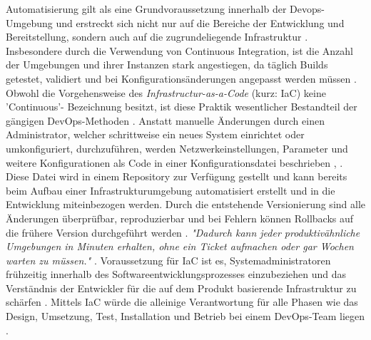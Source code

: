 Automatisierung gilt als eine Grundvoraussetzung innerhalb der Devops- Umgebung und erstreckt sich nicht nur auf die Bereiche der Entwicklung und Bereitstellung, sondern auch auf die zugrundeliegende Infrastruktur \cite[S. 272]{tiemeyer_handbuch_2021}. Insbesondere durch die Verwendung von Continuous Integration, ist die Anzahl der Umgebungen und ihrer Instanzen stark angestiegen, da täglich Builds getestet, validiert und bei Konfigurationsänderungen angepasst werden müssen \cite[S. 19]{sharma_devops_2017}. Obwohl die Vorgehensweise des \textit{Infrastructur-as-a-Code} (kurz: IaC) keine 'Continuous'- Bezeichnung besitzt, ist diese Praktik wesentlicher Bestandteil der gängigen DevOps-Methoden \cite[S. 30]{alt_innovationsorientiertes_2017}. Anstatt manuelle Änderungen durch einen Administrator, welcher schrittweise ein neues System einrichtet oder umkonfiguriert, durchzuführen, werden Netzwerkeinstellungen, Parameter und weitere Konfigurationen als Code in einer Konfigurationsdatei beschrieben \cite{juner_praxisbasierte_2017}, \cite{luber_was_2020}. Diese Datei wird in einem Repository zur Verfügung gestellt und kann bereits beim Aufbau einer Infrastrukturumgebung automatisiert erstellt und in die Entwicklung miteinbezogen werden. Durch die entstehende Versionierung sind alle Änderungen überprüfbar, reproduzierbar und bei Fehlern können Rollbacks auf die frühere Version durchgeführt werden \cite[S. 272]{tiemeyer_handbuch_2021}. \textit{"Dadurch kann jeder produktivähnliche Umgebungen in Minuten erhalten, ohne ein Ticket aufmachen oder gar Wochen warten zu müssen."} \cite[S. 107]{kim_devops-handbuch_2017}. Voraussetzung für IaC ist es, Systemadministratoren frühzeitig innerhalb des Softwareentwicklungsprozesses einzubeziehen und das Verständnis der Entwickler für die auf dem Produkt basierende Infrastruktur zu schärfen \cite[S. 30]{alt_innovationsorientiertes_2017}. Mittels IaC würde die alleinige Verantwortung für alle Phasen wie das Design, Umsetzung, Test, Installation und Betrieb bei einem DevOps-Team liegen \cite{kasteleiner_devops_2019}.









